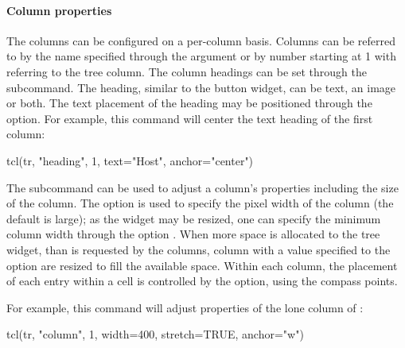 \paragraph{Column properties}
The columns can be configured on a per-column basis. Columns can be
referred to by the name specified through the  argument
or by number starting at 1 with  referring to the tree
column. The column headings can be set through the
 subcommand. The heading, similar to
the button widget, can be text, an image or both. The text placement
of the heading may be positioned through the  option. For
example, this command will center the text heading of the first
column:
\begin{Schunk}
\begin{Sinput}
 tcl(tr, "heading", 1, text="Host", anchor="center")
\end{Sinput}
\end{Schunk}

The  subcommand can be used to adjust
a column's properties including the size of the column. The option
 is used to specify the pixel width of the column (the
default is large); as the widget may be resized, one can specify the
minimum column width through the option . When more
space is allocated to the tree widget, than is requested by the
columns, column with a  value specified to the option
 are resized to fill the available space. Within each
column, the placement of each entry within a cell is controlled by the
 option, using the compass points.

For example, this command will adjust properties of the lone column of :
\begin{Schunk}
\begin{Sinput}
 tcl(tr, "column", 1, width=400,  stretch=TRUE, anchor="w")
\end{Sinput}
\end{Schunk}


